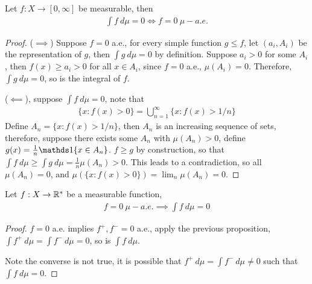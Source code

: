 \documentclass[11pt]{article}
\begin{document}
	\begin{proposition}
		Let $f: X \to [0, \infty]$ be measurable, then
		\begin{align}
			\int f\ d\mu = 0 \iff f = 0\ \mu-a.e.
		\end{align}
		\begin{proof}
			($\implies$) Suppose $f = 0$ a.e., for every simple function $g \leq f$, let $(a_i, A_i)$ be the representation of $g$, then $\int g\ d\mu = 0$ by definition. Suppose $a_i > 0$ for some $A_i$, then $f(x) \geq a_i > 0$ for all $x \in A_i$, since $f = 0$ a.e., $\mu(A_i) = 0$. Therefore, $\int g\ d\mu = 0$, so is the integral of $f$.
			
			($\impliedby$), suppose $\int f\ d\mu = 0$, note that
			\begin{align}
				\{x: f(x) > 0\} = \bigcup_{n=1}^\infty \{x: f(x) > 1/n\}
			\end{align}
			Define $A_n = \{x: f(x) > 1/n\}$, then $A_n$ is an increasing sequence of sets, therefore, suppose there exists some $A_n$ with $\mu(A_n) > 0$, define $g(x) = \frac{1}{n} \id{x \in A_n}$. $f \geq g$ by construction, so that $\int f\ d\mu \geq \int g\ d\mu = \frac{1}{n} \mu(A_n) > 0$. This leads to a contradiction, so all $\mu(A_n) = 0$, and $\mu(\{x: f(x) > 0\}) = \lim_n \mu(A_n) = 0$.
		\end{proof}
	\end{proposition}
	
	\begin{corollary}
		Let $f: X \to \mathbb{R}^*$ be a measurable function, 
		\begin{align}
			f = 0\ \mu-a.e. \implies \int f\ d\mu = 0
		\end{align}
		\begin{proof}
			$f=0$ a.e. implies $f^+, f^- = 0$ a.e., apply the previous proposition, $\int f^+\ d\mu = \int f^-\ d\mu = 0$, so is $\int f\ d\mu$.
			
			Note the converse is not true, it is possible that $f^+\ d\mu = \int f^-\ d\mu \neq 0$ such that $\int f\ d\mu = 0$.
		\end{proof}
	\end{corollary}
	
\end{document}
